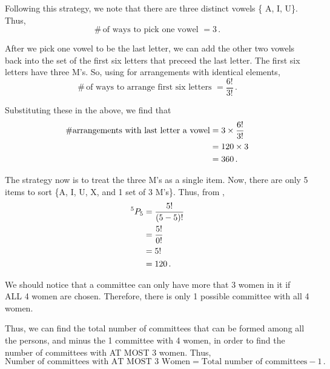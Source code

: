 \begin{subquestions}
\begin{subsubquestions}
Following this strategy, we note that there are three distinct vowels \{ A, I, U\}. Thus, 
\begin{equation}
	\#\,\text{of ways to pick one vowel } = 3 \,.
\end{equation}

After we pick one vowel to be the last letter, we can add the other two vowels back into the set of the first six letters that preceed the last letter. The first six letters have three M's. So, using  for arrangements with identical elements,
\begin{equation}
	\#\,\text{of ways to arrange first six letters } =\frac{6!}{3!} \,.
\end{equation}


Substituting these in the above, we find that
\begin{align}
	\# \text{arrangements with last letter a vowel}  &= 3 \times \frac{6!}{3!} \nonumber \\
	& = 120 \times 3 \nonumber \\
	                                            & = 360 \,.
\end{align}


\subsubquestion

The strategy now is to treat the three M's as a single item. Now, there are only 5 items to sort \{A, I, U, X, and 1 set of 3 M's\}. Thus, from ,
\begin{align}
	^{5}P_5 & = \frac{5!}{(5-5)!} \nonumber \\
	        & = \frac{5!}{0!} \nonumber \\
	        & = 5! \nonumber \\
	        & = 120 \,.
\end{align}

\end{subsubquestions}


\subquestion
We should notice that a committee can only have more that 3 women in it if ALL 4 women are chosen. Therefore, there is only 1 possible committee with all 4 women. 

Thus, we can find the total number of committees that can be formed among all the persons, and minus the 1 committee with 4 women, in order to find the number of committees with AT MOST 3 women. Thus,
\begin{equation}
  	\text{Number of committees with AT MOST 3 Women} = \text{Total number of committees} - 1 \,.
\end{equation}


\end{subquestions}
